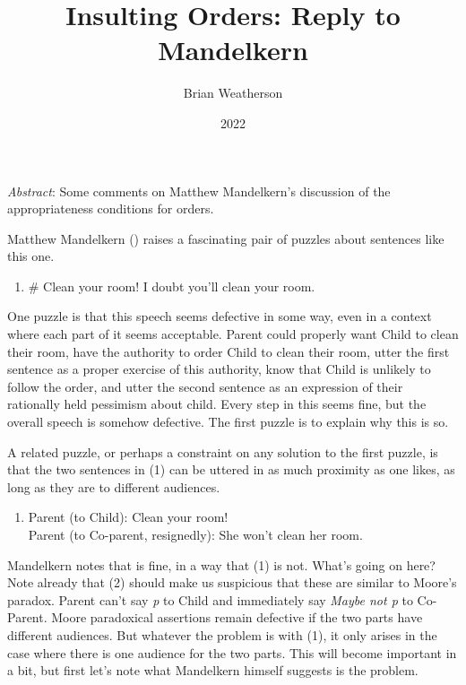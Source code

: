 \documentclass[
  11pt,
  letterpaper,
  DIV=11,
  numbers=noendperiod,
  twoside]{scrartcl}
\title{Insulting Orders: Reply to Mandelkern}
\author{Brian Weatherson}
\date{2022}
\providecommand{\tightlist}{%
  \setlength{\itemsep}{0pt}\setlength{\parskip}{0pt}}
\renewenvironment{abstract}
 {\vspace{-1.25cm}
 \quotation\small\noindent\emph{Abstract}:}
 {\endquotation}
\renewenvironment{abstract}
 {\quotation\small\noindent\emph{Abstract}:}
 {\endquotation\vspace{-0.02cm}}
\begin{document}
\maketitle
\begin{abstract}
Some comments on Matthew Mandelkern's discussion of the appropriateness
conditions for orders.
\end{abstract}


Matthew Mandelkern () raises a
fascinating pair of puzzles about sentences like this one.

\begin{enumerate}
\def\labelenumi{(\arabic{enumi})}
\tightlist
\item
  \# Clean your room! I doubt you'll clean your room.
\end{enumerate}

One puzzle is that this speech seems defective in some way, even in a
context where each part of it seems acceptable. Parent could properly
want Child to clean their room, have the authority to order Child to
clean their room, utter the first sentence as a proper exercise of this
authority, know that Child is unlikely to follow the order, and utter
the second sentence as an expression of their rationally held pessimism
about child. Every step in this seems fine, but the overall speech is
somehow defective. The first puzzle is to explain why this is so.

A related puzzle, or perhaps a constraint on any solution to the first
puzzle, is that the two sentences in (1) can be uttered in as much
proximity as one likes, as long as they are to different audiences.

\begin{enumerate}
\def\labelenumi{(\arabic{enumi})}
\setcounter{enumi}{1}
\tightlist
\item
  Parent (to Child): Clean your room!\\
  Parent (to Co-parent, resignedly): She won't clean her room.
\end{enumerate}

Mandelkern notes that is fine, in a way that (1) is not. What's going on
here? Note already that (2) should make us suspicious that these are
similar to Moore's paradox. Parent can't say \emph{p} to Child and
immediately say \emph{Maybe not p} to Co-Parent. Moore paradoxical
assertions remain defective if the two parts have different audiences.
But whatever the problem is with (1), it only arises in the case where
there is one audience for the two parts. This will become important in a
bit, but first let's note what Mandelkern himself suggests is the
problem.
\end{document}
